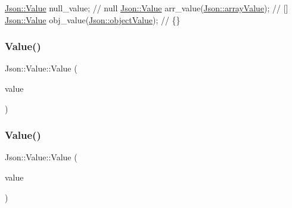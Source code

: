 \begin{DoxyCode}
\hyperlink{class_json_1_1_value}{Json::Value} null\_value; \textcolor{comment}{// null}
\hyperlink{class_json_1_1_value}{Json::Value} arr\_value(\hyperlink{namespace_json_a7d654b75c16a57007925868e38212b4eaa3025bfd271ef0b0c7c030c9118f8be7}{Json::arrayValue}); \textcolor{comment}{// []}
\hyperlink{class_json_1_1_value}{Json::Value} obj\_value(\hyperlink{namespace_json_a7d654b75c16a57007925868e38212b4ea6ca35c0a30ea3d1b8ec95c2d1e41a1a8}{Json::objectValue}); \textcolor{comment}{// \{\}}
\end{DoxyCode}
 \hypertarget{class_json_1_1_value_a4744ae571fcf34f4b16a2257b3b3b585}{}\label{class_json_1_1_value_a4744ae571fcf34f4b16a2257b3b3b585} 
\subsubsection{\texorpdfstring{Value()}{Value()}\hspace{0.1cm}{\footnotesize\ttfamily [14/24]}}
{\footnotesize\ttfamily Json\+::\+Value\+::\+Value (\begin{DoxyParamCaption}\item[{\hyperlink{class_json_1_1_value_abdf7a7ff73eb130ffcab28504ffdb405}{Int}}]{value }\end{DoxyParamCaption})}

\hypertarget{class_json_1_1_value_ae67a857b01286e3499a87e95be848d20}{}\label{class_json_1_1_value_ae67a857b01286e3499a87e95be848d20} 
\subsubsection{\texorpdfstring{Value()}{Value()}\hspace{0.1cm}{\footnotesize\ttfamily [15/24]}}
{\footnotesize\ttfamily Json\+::\+Value\+::\+Value (\begin{DoxyParamCaption}\item[{\hyperlink{class_json_1_1_value_a0933d59b45793ae4aade1757c322a98d}{U\+Int}}]{value }\end{DoxyParamCaption})}

\hypertarget{class_json_1_1_value_ab1cdc3d9a4d4cc03fa01439d43ceb1b5}{}\label{class_json_1_1_value_ab1cdc3d9a4d4cc03fa01439d43ceb1b5} 
